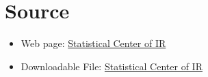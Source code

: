 \documentclass[fleqn]{report}
\begin{document}
\chapter*{Source}
\begin{itemize}
    \item Web page: \href{https://www.amar.org.ir/%D9%BE%D8%A7%DB%8C%DA%AF%D8%A7%D9%87-%D9%87%D8%A7-%D9%88-%D8%B3%D8%A7%D9%85%D8%A7%D9%86%D9%87-%D9%87%D8%A7/%D8%B3%D8%B1%DB%8C%D9%87%D8%A7%DB%8C-%D8%B2%D9%85%D8%A7%D9%86%DB%8C/agentType/ViewType/PropertyTypeID/2061}{Statistical Center of IR}
    \item Downloadable File: \href{https://www.amar.org.ir/Portals/0/PropertyAgent/461/Files/9346/2302n220140104.xlsx}{Statistical Center of IR}
\end{itemize}

 
\end{document}
